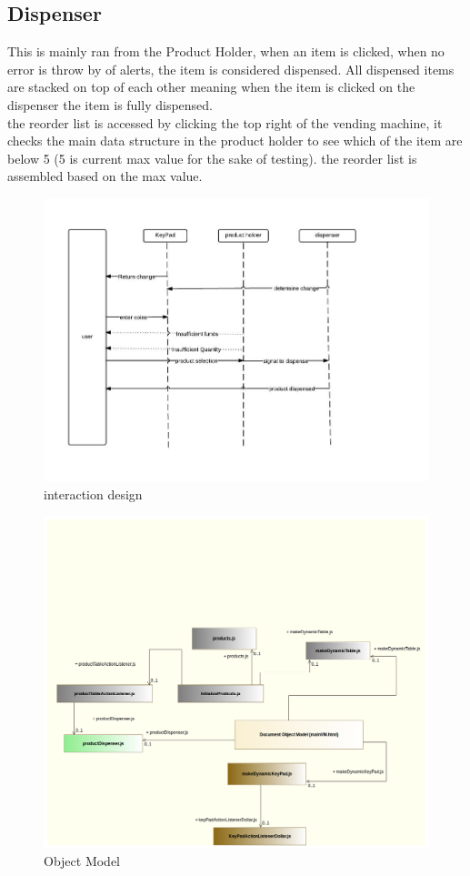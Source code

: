 \documentclass[a4paper,12pt]{article}
\begin{document}
\subsection{Dispenser}
This is mainly ran from the Product Holder, when an item is clicked, when no error is throw by of alerts, the item is considered dispensed. All dispensed items are stacked on top of each other meaning when the item is clicked on the dispenser the item is fully dispensed.\\
\indent the reorder list is accessed by clicking the top right of the vending machine, it checks the main data structure in the product holder to see which of the item are below 5 (5 is current max value for the sake of testing). the reorder list is assembled based on the max value.   

\begin{figure}[ht!]
\centering
\includegraphics[scale=0.4]{interAction.jpeg}
\caption{interaction design}
\label{overflow}
\end{figure}





\begin{figure}[ht!]
\centering
\includegraphics[scale=0.4]{ObjectModelvm.png}
\caption{Object Model}
\label{overflow}
\end{figure}
\end{document}
